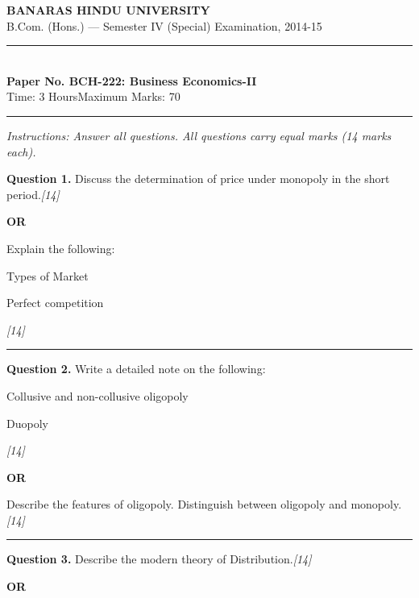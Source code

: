 \documentclass[11pt,a4paper]{article}
\newcommand{\pts}[1]{\hfill   \textit{[#1]}}
\begin{document}
\begin{center}
  {\large\bfseries BANARAS HINDU UNIVERSITY}\\[2pt]
  {\normalsize B.Com. (Hons.) --- Semester IV (Special) Examination, 2014-15}\\[6pt]
  \rule{0.8\linewidth}{0.5pt}\\[6pt]
  {\large\bfseries Paper No. BCH-222: Business Economics-II}\\[4pt]
  {\normalsize Time: 3 Hours\hfill Maximum Marks: 70}
\end{center}

\rule{\linewidth}{0.4pt}

\smallskip



\noindent   \textit{Instructions: Answer all questions. All questions carry equal marks (14 marks each).}

\bigskip




\noindent   \textbf{Question 1.}
Discuss the determination of price under monopoly in the short period.\pts{14}

\centerline{   \textbf{OR}}

Explain the following:

\begin{parts}
  \item Types of Market
  \item Perfect competition
\end{parts}\pts{14}

\medskip\rule{\linewidth}{0.2pt}




\noindent   \textbf{Question 2.}
Write a detailed note on the following:

\begin{parts}
  \item Collusive and non-collusive oligopoly
  \item Duopoly
\end{parts}\pts{14}

\centerline{   \textbf{OR}}

Describe the features of oligopoly. Distinguish between oligopoly and monopoly.\pts{14}

\medskip\rule{\linewidth}{0.2pt}




\noindent   \textbf{Question 3.}
Describe the modern theory of Distribution.\pts{14}

\centerline{   \textbf{OR}}
\end{document}
